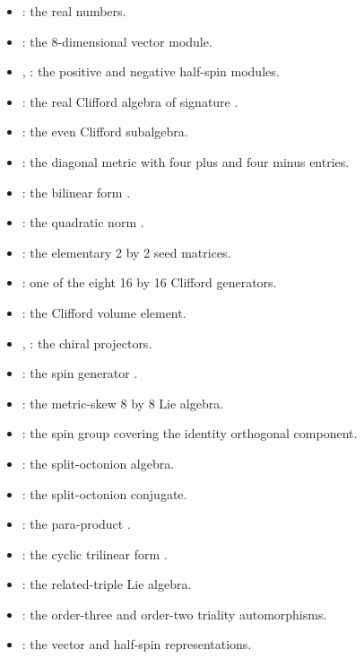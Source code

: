 \documentclass[11pt]{article}
\begin{document}
\begin{itemize}
\item \texttt{}: the real numbers.
\item \texttt{}: the 8-dimensional vector module.
\item \texttt{}, \texttt{}: the positive and negative half-spin modules.
\item \texttt{}: the real Clifford algebra of signature \texttt{}.
\item \texttt{}: the even Clifford subalgebra.
\item \texttt{}: the diagonal metric with four plus and four minus entries.
\item \texttt{}: the bilinear form \texttt{}.
\item \texttt{}: the quadratic norm \texttt{}.
\item \texttt{}: the elementary 2 by 2 seed matrices.
\item \texttt{}: one of the eight 16 by 16 Clifford generators.
\item \texttt{}: the Clifford volume element.
\item \texttt{}, \texttt{}: the chiral projectors.
\item \texttt{}: the spin generator \texttt{}.
\item \texttt{}: the metric-skew 8 by 8 Lie algebra.
\item \texttt{}: the spin group covering the identity orthogonal component.
\item \texttt{}: the split-octonion algebra.
\item \texttt{}: the split-octonion conjugate.
\item \texttt{}: the para-product \texttt{}.
\item \texttt{}: the cyclic trilinear form \texttt{}.
\item \texttt{}: the related-triple Lie algebra.
\item \texttt{}: the order-three and order-two triality automorphisms.
\item \texttt{}: the vector and half-spin representations.

\end{itemize}
\end{document}
